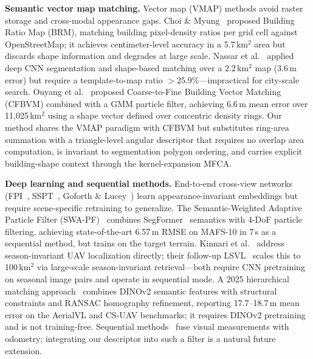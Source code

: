 \documentclass[10pt]{article}
\theoremstyle{plain}
\theoremstyle{definition}
\begin{document}
\noindent\textbf{Semantic vector map matching.}
Vector map (VMAP) methods avoid raster storage and cross-modal appearance gaps.
Choi \& Myung~\cite{choi2020brm} proposed Building Ratio Map (BRM), matching
building pixel-density ratios per grid cell against OpenStreetMap; it achieves
centimeter-level accuracy in a 5.7\,km$^2$ area but discards shape information
and degrades at large scale.
Nassar et al.~\cite{nassar2018deep} applied deep CNN segmentation and
shape-based matching over a 2.2\,km$^2$ map (3.6\,m error) but require a
template-to-map ratio $>$25.9\%---impractical for city-scale search.
Ouyang et al.~\cite{ouyang2024cfbvm} proposed Coarse-to-Fine Building Vector
Matching (CFBVM) combined with a GMM particle filter, achieving 6.6\,m mean
error over 11,025\,km$^2$ using a shape vector defined over concentric
density rings.
Our method shares the VMAP paradigm with CFBVM but substitutes ring-area
summation with a triangle-level angular descriptor that requires no overlap
area computation, is invariant to segmentation polygon ordering, and carries
explicit building-shape context through the kernel-expansion MFCA.


\noindent\textbf{Deep learning and sequential methods.}
End-to-end cross-view networks
(FPI~\cite{dai2022fpi}, SSPT~\cite{fan2024sspt},
Goforth \& Lucey~\cite{goforth2019gps}) learn appearance-invariant embeddings
but require scene-specific retraining to generalize.
The Semantic-Weighted Adaptive Particle Filter (SWA-PF)~\cite{yuan2025swapf}
combines SegFormer~\cite{xie2021segformer} semantics with 4-DoF particle
filtering, achieving state-of-the-art 6.57\,m RMSE on MAFS-10 in 7\,s as a
sequential method, but trains on the target terrain.
Kinnari et al.~\cite{kinnari2022season} address season-invariant UAV
localization directly; their follow-up LSVL~\cite{kinnari2023lsvl} scales this
to 100\,km$^2$ via large-scale season-invariant retrieval---both require CNN
pretraining on seasonal image pairs and operate in sequential mode.
A 2025 hierarchical matching approach~\cite{hieruav2025} combines DINOv2
semantic features with structural constraints and RANSAC homography refinement,
reporting 17.7--18.7\,m mean error on the AerialVL and CS-UAV benchmarks;
it requires DINOv2 pretraining and is not training-free.
Sequential methods~\cite{conte2009vision,shan2015google} fuse visual
measurements with odometry; integrating our descriptor into such a filter
is a natural future extension.
\end{document}
